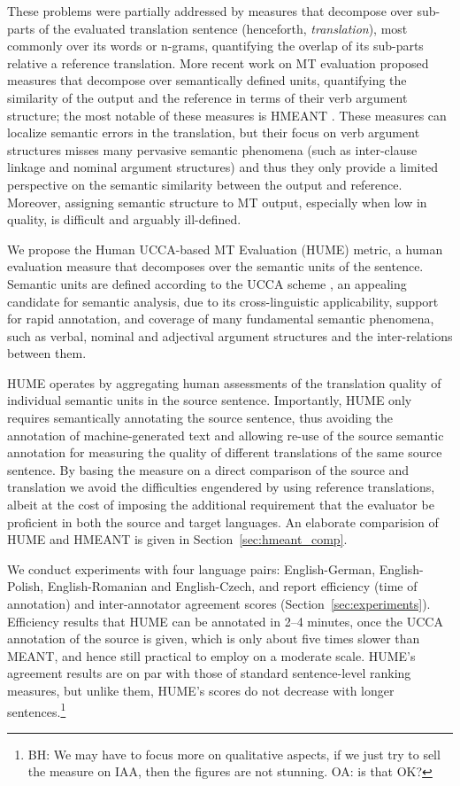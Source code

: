 \documentclass[11pt]{article}
\newcommand{\secref}[1]{Section~\ref{#1}}
\newcommand{\bh}[1]{\footnote{\color{blue}BH: #1}}
\begin{document}
These problems were partially addressed by measures that decompose over sub-parts of the evaluated
translation sentence (henceforth, {\it translation}),
most commonly over its words or n-grams,
quantifying the overlap of its sub-parts relative a reference translation.
More recent work on MT evaluation proposed measures
that decompose over semantically defined units,
quantifying the similarity of the output and the reference in terms of
their verb argument structure; the most notable of these measures is
HMEANT \cite{lo2011structured}.
These measures can localize semantic errors in the translation, but
their focus on verb argument structures misses many pervasive semantic phenomena
(such as inter-clause linkage and nominal argument structures) and thus they only provide
a limited perspective on the semantic similarity between the output and reference.
Moreover, assigning semantic structure to MT output, especially when low in quality,
is difficult and arguably ill-defined.

We propose the Human UCCA-based MT Evaluation (HUME) metric,
a human evaluation measure that decomposes over the semantic units of the sentence.
Semantic units are defined according to the 
UCCA scheme \cite{abend2013universal}, an appealing candidate for semantic analysis,
due to its cross-linguistic applicability, support for rapid annotation, and coverage
of many fundamental semantic phenomena, such as verbal, nominal and adjectival
argument structures and the inter-relations between them.

HUME operates by aggregating human assessments of the translation quality of individual
semantic units in the source sentence.
Importantly, HUME only requires semantically annotating the source sentence,
thus avoiding the annotation of machine-generated text 
and allowing re-use of the source semantic annotation for measuring the quality
of different translations of the same source sentence.
By basing the measure on a direct comparison
of the source and translation we avoid the difficulties engendered by using
reference translations, albeit at the cost of imposing the additional requirement
that the evaluator be proficient in both the source and target languages.
An elaborate comparision of HUME and HMEANT is given in \secref{sec:hmeant_comp}.

We conduct experiments with four language pairs: English-German, English-Polish,
English-Romanian and English-Czech, and report efficiency (time of annotation) and
inter-annotator agreement scores (\secref{sec:experiments}). Efficiency results that HUME
can be annotated in 2--4 minutes, once the UCCA annotation of the source is given,
which is only about five times slower than MEANT, and hence still practical to
employ on a moderate scale. HUME's agreement results are on par with those
of standard sentence-level ranking measures, but unlike them,
HUME's scores do not decrease with longer sentences.\bh{We may
  have to focus more on qualitative aspects, if we just try to sell
  the measure on IAA, then the figures are not stunning. OA: is that OK?}
\end{document}
